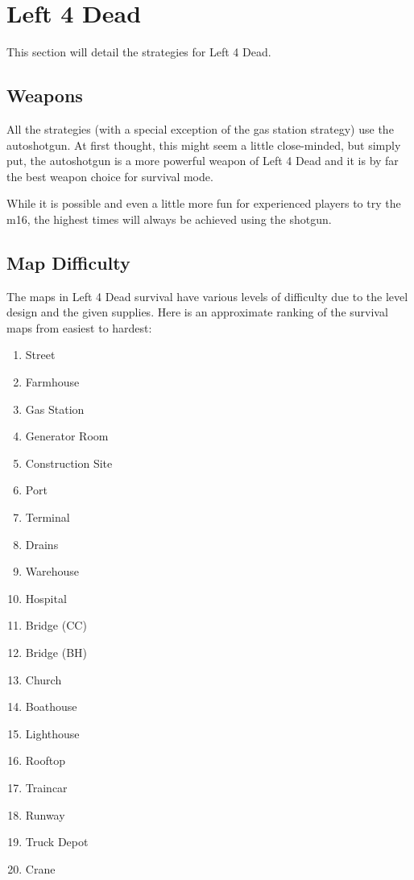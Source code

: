 \chapter{Left 4 Dead}
This section will detail the strategies for Left 4 Dead.

\section{Weapons}
All the strategies (with a special exception of the gas station strategy) use the autoshotgun. At first thought, this might seem a little close-minded, but simply put, the autoshotgun is a more powerful weapon of Left 4 Dead and it is by far the best weapon choice for survival mode.

While it is possible and even a little more fun for experienced players to try the m16, the highest times will always be achieved using the shotgun.

\section{Map Difficulty}
The maps in Left 4 Dead survival have various levels of difficulty due to the level design and the given supplies. Here is an approximate ranking of the survival maps from easiest to hardest:
\begin{enumerate}
\item Street
\item Farmhouse
\item Gas Station
\item Generator Room
\item Construction Site
\item Port
\item Terminal
\item Drains
\item Warehouse
\item Hospital
\item Bridge (CC)
\item Bridge (BH)
\item Church
\item Boathouse
\item Lighthouse
\item Rooftop
\item Traincar
\item Runway
\item Truck Depot
\item Crane
\end{enumerate}

